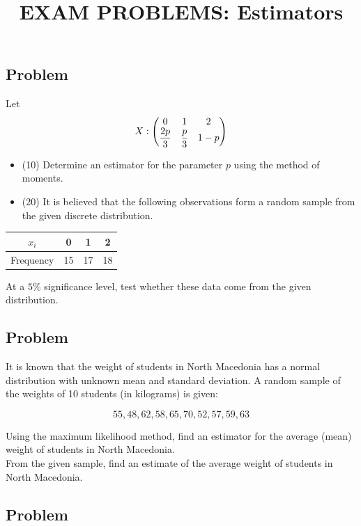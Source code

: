 \documentclass[a4paper, 12pt]{article}
\title{
  \vspace{-1.5cm}
  \textbf{EXAM PROBLEMS: Estimators}
  \vspace{-1.5cm}
}
\date{}
\begin{document}
\maketitle


\subsection{Problem}

Let \[X : \mqty( 0 & 1 & 2 \\ \displaystyle\frac{2p}{3}  & \displaystyle\frac{p}{3} & 1-p)\]


\begin{itemize}
  \item [A)] (10) Determine an estimator for the parameter $p$ using the method of moments.

  \item [B)] (20) It is believed that the following observations form a random sample from the given discrete distribution.

\end{itemize}
\begin{table}[h!]
\centering
\begin{tabular}{|c|c|c|c|}
\hline
$x_i$     & 0  & 1  & 2  \\ \hline
Frequency & 15 & 17 & 18 \\ \hline
\end{tabular}
\end{table}

At a $5\%$ significance level, test whether these data come from the given distribution.




\subsection{Problem}
It is known that the weight of students in North Macedonia has a normal distribution with unknown mean and standard deviation. A random sample of the weights of 10 students (in kilograms) is given:

\[ 55, 48, 62, 58, 65, 70, 52, 57, 59, 63 \]

Using the maximum likelihood method, find an estimator for the average (mean) weight of students in North Macedonia.\\

From the given sample, find an estimate of the average weight of students in North Macedonia.

\subsection{Problem}
\end{document}

